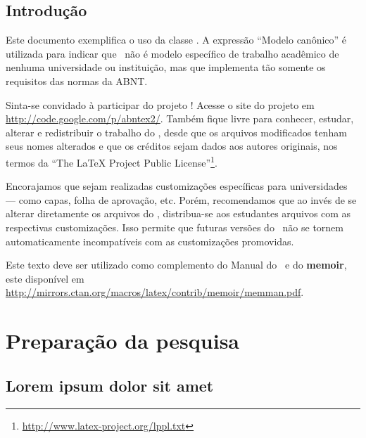 \documentclass[12pt,openright,twoside,a4paper]{abntex2}
\begin{document}
\chapter*{Introdução}

Este documento exemplifica o uso da classe \abnTeX. A expressão ``Modelo
canônico'' é utilizada para indicar que \abnTeX~não é modelo específico de
trabalho acadêmico de nenhuma universidade ou instituição, mas que implementa
tão somente os requisitos das normas da ABNT.

Sinta-se convidado à participar do projeto \abnTeX! Acesse o site do projeto em
\url{http://code.google.com/p/abntex2/}. Também fique livre para conhecer,
estudar, alterar e redistribuir o trabalho do \abnTeX, desde que os arquivos
modificados tenham seus nomes alterados e que os créditos sejam dados aos
autores originais, nos termos da ``The LaTeX Project Public
License''\footnote{\url{http://www.latex-project.org/lppl.txt}}.

Encorajamos que sejam realizadas customizações específicas para universidades
--- como capas, folha de aprovação, etc. Porém, recomendamos que ao invés de se
alterar diretamente os arquivos do \abnTeX, distribua-se aos estudantes
arquivos com as respectivas customizações. Isso permite que futuras versões do
\abnTeX~não se tornem automaticamente incompatíveis com as customizações
promovidas.

Este texto deve ser utilizado como complemento do Manual do \abnTeX~e do
\textbf{memoir}, este disponível em
\url{http://mirrors.ctan.org/macros/latex/contrib/memoir/memman.pdf}.


\part{Preparação da pesquisa}

\chapter{Lorem ipsum dolor sit amet}
\end{document}
